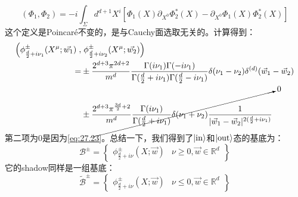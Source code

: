 \begin{equation}
	(\Phi_1,\Phi_2)=-i\int_\Sigma d^{d+1}X^i\left[\Phi_1(X)\partial_{X^0}\Phi_2^*(X)-\partial_{X^0}\Phi_1(X)\Phi_2^*(X)\right]
\end{equation}
这个定义是Poincar\'e不变的，是与Cauchy面选取无关的。计算得到：
\begin{equation}
	\begin{aligned}
		\left(\phi_{\frac{d}{2}+i\nu_{1}}^{\pm}(X^{\mu};\vec{w_{1}})\right.,&\left.\phi_{\frac{d}{2}+i\nu_{2}}^{\pm}(X^{\mu};\vec{w_{2}})\right) \\
		=&\pm\frac{2^{d+3}\pi^{2d+2}}{m^{d}}\frac{\Gamma(i\nu_{1})\Gamma(-i\nu_{1})}{\Gamma(\frac{d}{2}+i\nu_{1})\Gamma(\frac{d}{2}-i\nu_{1})}\delta(\nu_{1}-\nu_{2})\delta^{(d)}(\vec{w}_{1}-\vec{w}_{2}) \\
		&\pm\cancelto{0}{\frac{2^{d+3}\pi^{\frac{3d}{2}+2}}{m^{d}}\frac{\Gamma(i\nu_{1})}{\Gamma(\frac{d}{2}+i\nu_{1})}\delta(\nu_{1}+\nu_{2})\frac{1}{|\vec{w}_{1}-\vec{w}_{2}|^{2(\frac{d}{2}+i\nu_{1})}}}
	\end{aligned}
\end{equation}
第二项为$0$是因为\ref{eq:27.23}。总结一下，我们得到了$\ket{\text{in}}$和$\ket{\text{out}}$态的基底为：
\begin{equation}
	\boxed{\mathcal{B}^{\pm}=\left\{\begin{array}{c|c}\phi_{\frac{d}{2}+i\nu}^{\pm}(X;\vec{w})&\nu\geq0,\vec{w}\in\mathbb{R}^d\end{array}\right\}}
\end{equation}
它的shadow同样是一组基底：
\begin{equation}
	\boxed{\widetilde{\mathcal{B}}^\pm=\left\{\begin{array}{c|c}\phi_{\frac{d}{2}+i\nu}^\pm(X;\vec{w})&\nu\le0,\vec{w}\in\mathbb{R}^d\end{array}\right\}}
\end{equation}

